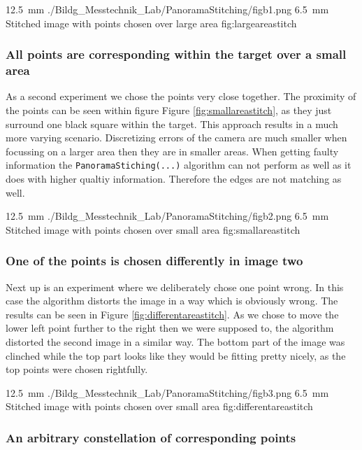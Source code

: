 \documentclass[
a4paper,     %
11pt         %
]{scrartcl}  %
\begin{document}
{\SI{12.5}{mm}}
{./Bildg_Messtechnik_Lab/PanoramaStitching/figb1.png}
{\SI{6.5}{mm}}
{Stitched image with points chosen over large area}
{fig:largeareastitch}

\subsubsection{All points are corresponding within the target over a small area}

As a second experiment we chose the points very close together.
The proximity of the points can be seen within figure Figure \ref{fig:smallareastitch}, as they just surround one black square within the target.
This approach results in a much more varying scenario.
Discretizing errors of the camera are much smaller when focussing on a larger area then they are in smaller areas.
When getting faulty information the \lstinline{PanoramaStiching(...)} algorithm can not perform as well as it does with higher qualtiy information.
Therefore the edges are not matching as well.

{\SI{12.5}{mm}}
{./Bildg_Messtechnik_Lab/PanoramaStitching/figb2.png}
{\SI{6.5}{mm}}
{Stitched image with points chosen over small area}
{fig:smallareastitch}

\subsubsection{One of the points is chosen differently in image two}

Next up is an experiment where we deliberately chose one point wrong.
In this case the algorithm distorts the image in a way which is obviously wrong.
The results can be seen in Figure \ref{fig:differentareastitch}.
As we chose to move the lower left point further to the right then we were supposed to, the algorithm distorted the second image in a similar way.
The bottom part of the image was clinched while the top part looks like they would be fitting pretty nicely, as the top points were chosen rightfully.

{\SI{12.5}{mm}}
{./Bildg_Messtechnik_Lab/PanoramaStitching/figb3.png}
{\SI{6.5}{mm}}
{Stitched image with points chosen over small area}
{fig:differentareastitch}

\subsubsection{An arbitrary constellation of corresponding points}
\end{document}
